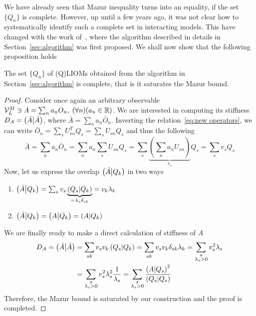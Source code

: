 We have already seen that Mazur inequality turns into an equality, if the set \(\{Q_n\}\) is complete. However,
up until a few years ago, it was not clear how to systematically identify such a complete set in interacting models.
This have changed with the work of~\textcite{Mierzejewski2015a}, where the algorithm described in details
in Section~\ref{sec:algorithm} was first proposed. We shall now show that the following proposition holds~\autocite{Mierzejewski2015Approx}
\begin{proposition}
  The set \(\{Q_n\}\) of (Q)LIOMs obtained from the algorithm in Section~\ref{sec:algorithm} is complete,
  that is it saturates the Mazur bound. 
\label{prop:saturation}
\end{proposition}
\begin{proof}
  Consider once again an arbitrary observable \(\mathcal{V}_L^M \ni A = \sum_n a_n O_n,\; 
  (\forall n) (a_n \in \mathbb{R})\). We are interested in computing its stiffness \(D_A = \left(\bar{A} \middle| \bar{A}\right)\), 
  where \(\bar{A} = \sum_n a_n \bar{O}_n\). Inverting the relation~\eqref{eq:new operators}, we can write 
  \(\bar{O}_n = \sum_s U_{ns}^T Q_s = \sum_s U_{sn} Q_s\) and thus the following
  \begin{equation*}
    \bar{A} = \sum_n a_n \bar{O}_n = \sum_n a_n \sum_s U_{sn} Q_s =
    \sum_s \underbrace{\left(\sum_n a_n U_{sn}\right)}_{v_s} Q_s = \sum_s v_s Q_s
  \end{equation*}
  Now, let us express the overlap \(\left(\bar{A} \middle| Q_k\right)\) in two ways
  \begin{enumerate}
    \item \(\left(\bar{A} \middle| Q_k\right) = \sum_s v_s \underbrace{\left(Q_s \middle| Q_k\right)}_{=\lambda_s \delta_{sk}} = v_k \lambda_k\)
    \item \(\left(\bar{A} \middle| Q_k\right) = \left(A \middle| \bar{Q_k}\right) = \left(A \middle| Q_k\right)\)
  \end{enumerate}
  We are finally ready to make a direct calculation of stiffness of \(A\)
  \begin{align*}
    D_A = \left(\bar{A} \middle| \bar{A}\right) &= \sum_{sk} v_s v_k \left(Q_s \middle| Q_k\right) = \sum_{sk} v_s v_k \delta_{sk} \lambda_{k} = 
    \sum_{\substack{s\\\lambda_s > 0}} v_s^2 \lambda_s \\
    &= \sum_{\substack{s\\\lambda_s > 0}} v_s^2 \lambda_s^2 \frac{1}{\lambda_s} = 
    \sum_{\substack{s\\\lambda_s > 0}} \frac{\left(A \middle| Q_s\right)^2}{\left(Q_s \middle| Q_s\right)}
  \end{align*}
  Therefore, the Mazur bound is saturated by our construction and the proof is completed.
\end{proof}
